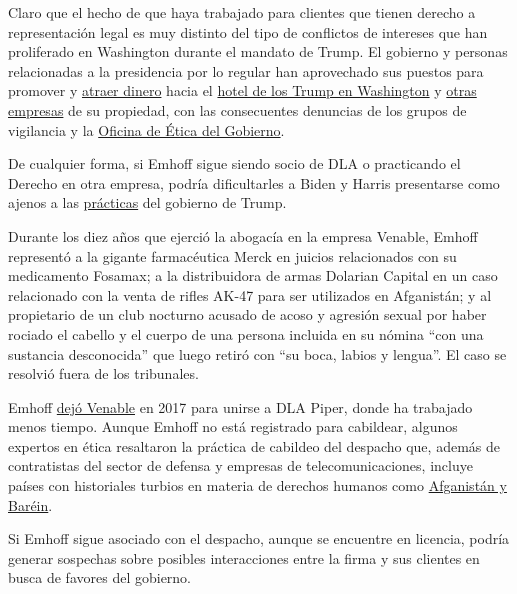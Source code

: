 Claro que el hecho de que haya trabajado para clientes que tienen
derecho a representación legal es muy distinto del tipo de conflictos de
intereses que han proliferado en Washington durante el mandato de Trump.
El gobierno y personas relacionadas a la presidencia por lo regular han
aprovechado sus puestos para promover y
\href{https://www.washingtonpost.com/politics/trump-company-secret-service-spending/2020/08/27/9331bd86-de36-11ea-8051-d5f887d73381_story.html}{atraer
dinero} hacia el
\href{https://www.nytimes3xbfgragh.onion/2019/09/07/us/politics/trump-hotel.html}{hotel
de los Trump en Washington} y
\href{https://www.nytimes3xbfgragh.onion/2018/01/24/us/politics/pro-trump-fundraising-trump-hotel.html}{otras
empresas} de su propiedad, con las consecuentes denuncias de los grupos
de vigilancia y la
\href{https://www.nytimes3xbfgragh.onion/2017/02/14/us/politics/Kellyanne-Conway-ivanka-trump-ethics.html}{Oficina
de Ética del Gobierno}.

De cualquier forma, si Emhoff sigue siendo socio de DLA o practicando el
Derecho en otra empresa, podría dificultarles a Biden y Harris
presentarse como ajenos a las
\href{https://www.nytimes3xbfgragh.onion/2019/10/18/climate/trump-cabinet-lobbyists.html}{prácticas}
del gobierno de Trump.

Durante los diez años que ejerció la abogacía en la empresa Venable,
Emhoff representó a la gigante farmacéutica Merck en juicios
relacionados con su medicamento Fosamax; a la distribuidora de armas
Dolarian Capital en un caso relacionado con la venta de rifles AK-47
para ser utilizados en Afganistán; y al propietario de un club nocturno
acusado de acoso y agresión sexual por haber rociado el cabello y el
cuerpo de una persona incluida en su nómina ``con una sustancia
desconocida'' que luego retiró con ``su boca, labios y lengua''. El caso
se resolvió fuera de los tribunales.

Emhoff
\href{https://www.dlapiper.com/en/us/news/2017/09/dla-piper-adds-leading-litigator-douglas-emhoff/}{dejó
Venable} en 2017 para unirse a DLA Piper, donde ha trabajado menos
tiempo. Aunque Emhoff no está registrado para cabildear, algunos
expertos en ética resaltaron la práctica de cabildeo del despacho que,
además de contratistas del sector de defensa y empresas de
telecomunicaciones, incluye países con historiales turbios en materia de
derechos humanos como
\href{https://efile.fara.gov/docs/3712-Supplemental-Statement-20200330-32.pdf}{Afganistán
y Baréin}.

Si Emhoff sigue asociado con el despacho, aunque se encuentre en
licencia, podría generar sospechas sobre posibles interacciones entre la
firma y sus clientes en busca de favores del gobierno.

